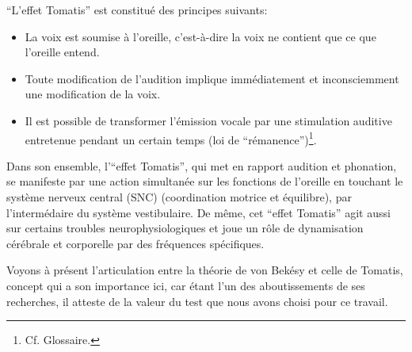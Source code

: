 ``L'effet Tomatis'' \autocite{tomatis_conf1972} est constitué des principes suivants:
\begin{itemize}
	\item La voix est soumise à l'oreille, c'est-à-dire la voix ne contient que ce que l'oreille entend.
	\item Toute modification de l'audition implique immédiatement
          et inconsciemment une
          modification de la voix.
	\item Il est possible de transformer l'émission vocale par une stimulation
auditive
		entretenue pendant un certain temps (loi de
               ``\gls{rémanence}'')\footnote{Cf. Glossaire.}.

\end{itemize}
Dans son ensemble, l'``effet Tomatis'', qui met en rapport audition et phonation, se manifeste par une 
action
simultanée sur les fonctions de
l'oreille en touchant le système nerveux central (SNC) (coordination
                motrice et équilibre), par l'intermédaire du système
                vestibulaire.
                De même, cet ``effet Tomatis'' agit aussi sur certains troubles
                neurophysiologiques et  joue un rôle de dynamisation cérébrale et corporelle
                par des fréquences spécifiques.


Voyons à présent l'articulation entre la théorie de von Bekésy et celle de Tomatis, concept qui a son 
importance ici, car étant  l'un des aboutissements de ses recherches, il atteste de la valeur du test que 
nous avons choisi pour ce travail.

